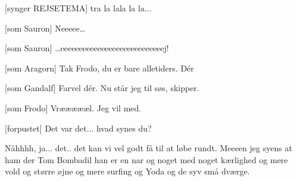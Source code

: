 \documentclass[a4paper,11pt]{article}
\begin{document}
\begin{sketch}
   [synger REJSETEMA] tra la lala la la...
  
  
   
    

  
   
  
  [som Sauron] Neeeee\ldots


  [som Sauron] \ldots eeeeeeeeeeeeeeeeeeeeeeeeeeeej!
  
  
   
  

  [som Aragorn] Tak Frodo, du er bare alletiders. D\'er
  
   


  [som Gandalf] Farvel d\'er. Nu står jeg til søs, skipper.

  [som Frodo] Vræææææl. Jeg vil med.
  

  [forpustet] Det var det... hvad synes du?



   Nåhhhh, ja... det.. det kan vi vel godt få til at løbe
  rundt. Meeeen jeg syens at ham der Tom Bombadil han er en nar og
  noget med noget kærlighed og mere vold og større øjne og mere
  surfing og Yoda og de syv små dværge.

  
\end{sketch}
\end{document}
